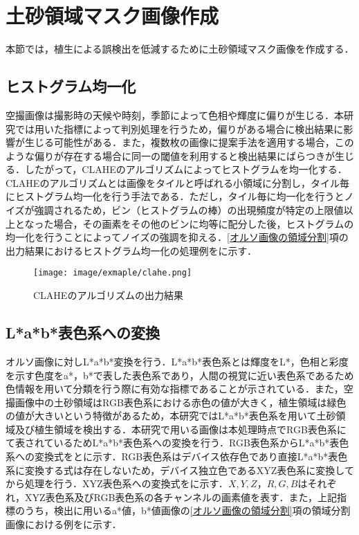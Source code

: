   \section{土砂領域マスク画像作成}
    \label{土砂領域マスク画像作成}
    本節では，植生による誤検出を低減するために土砂領域マスク画像を作成する．


    \subsection{ヒストグラム均一化}
      空撮画像は撮影時の天候や時刻，季節によって色相や輝度に偏りが生じる．本研究では用いた指標によって判別処理を行うため，偏りがある場合に検出結果に影響が生じる可能性がある．また，複数枚の画像に提案手法を適用する場合，このような偏りが存在する場合に同一の閾値を利用すると検出結果にばらつきが生じる．したがって，CLAHEのアルゴリズム\cite{CLAHEのアルゴリズム}によってヒストグラムを均一化する．CLAHEのアルゴリズムとは画像をタイルと呼ばれる小領域に分割し，タイル毎にヒストグラム均一化を行う手法である．ただし，タイル毎に均一化を行うとノイズが強調されるため，ビン（ヒストグラムの棒）の出現頻度が特定の上限値以上となった場合，その画素をその他のビンに均等に配分した後，ヒストグラムの均一化を行うことによってノイズの強調を抑える．\ref{オルソ画像の領域分割}項の出力結果におけるヒストグラム均一化の処理例をに示す．

      \begin{figure}[t]
        \centering
        \texttt{[image: image/exmaple/clahe.png]}
        \caption{CLAHEのアルゴリズムの出力結果}
        \label{CLAHEのアルゴリズム結果}
      \end{figure}


    \subsection{L*a*b*表色系への変換}
      \label{L*a*b*表色系への変換}
      オルソ画像に対しL*a*b*変換\cite{Lab表色系1}を行う．L*a*b*表色系とは輝度をL*，色相と彩度を示す色度をa*，b*で表した表色系であり，人間の視覚に近い表色系であるため色情報を用いて分類を行う際に有効な指標であることが示されている．また，空撮画像中の土砂領域はRGB表色系における赤色の値が大きく，植生領域は緑色の値が大きいという特徴があるため，本研究ではL*a*b*表色系を用いて土砂領域及び植生領域を検出する\cite{Lab表色系2, Lab表色系3, Lab表色系4}．本研究で用いる画像は本処理時点でRGB表色系にて表されているためL*a*b*表色系への変換を行う．RGB表色系からL*a*b*表色系への変換式をとに示す．RGB表色系はデバイス依存色であり直接L*a*b*表色系に変換する式は存在しないため，デバイス独立色であるXYZ表色系\cite{XYZ表色系}に変換してから処理を行う．XYZ表色系への変換式をに示す．$X,Y,Z$，$R,G,B$はそれぞれ，XYZ表色系及びRGB表色系の各チャンネルの画素値を表す．また，上記指標のうち，検出に用いるa*値，b*値画像の\ref{オルソ画像の領域分割}項の領域分割画像における例をに示す．

